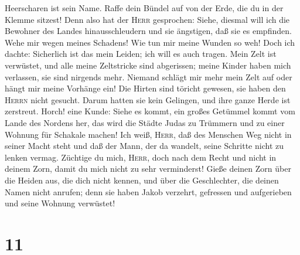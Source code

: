 Heerscharen ist sein Name.  Raffe dein Bündel auf von der
Erde, die du in der Klemme sitzest!  Denn also hat der
\textsc{Herr} gesprochen: Siehe, diesmal will ich die Bewohner des
Landes hinausschleudern und sie ängstigen, daß sie es empfinden.
 Wehe mir wegen meines Schadens! Wie tun mir meine Wunden
so weh! Doch ich dachte: Sicherlich ist das mein Leiden; ich will es
auch tragen.  Mein Zelt ist verwüstet, und alle meine
Zeltstricke sind abgerissen; meine Kinder haben mich verlassen, sie sind
nirgends mehr. Niemand schlägt mir mehr mein Zelt auf oder hängt mir
meine Vorhänge ein!  Die Hirten sind töricht gewesen, sie
haben den \textsc{Herrn} nicht gesucht. Darum hatten sie kein Gelingen,
und ihre ganze Herde ist zerstreut.  Horch! eine Kunde:
Siehe es kommt, ein großes Getümmel kommt vom Lande des Nordens her, das
wird die Städte Judas zu Trümmern und zu einer Wohnung für Schakale
machen!  Ich weiß, \textsc{Herr}, daß des Menschen Weg
nicht in seiner Macht steht und daß der Mann, der da wandelt, seine
Schritte nicht zu lenken vermag.  Züchtige du mich,
\textsc{Herr}, doch nach dem Recht und nicht in deinem Zorn, damit du
mich nicht zu sehr verminderst!  Gieße deinen Zorn über
die Heiden aus, die dich nicht kennen, und über die Geschlechter, die
deinen Namen nicht anrufen; denn sie haben Jakob verzehrt, gefressen und
aufgerieben und seine Wohnung verwüstet!

\hypertarget{section-10}{%
\section{11}\label{section-10}}

